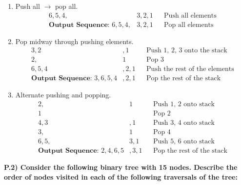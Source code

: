 \documentclass[12pt]{article}
\begin{document}
\begin{enumerate}
	\item Push all $\to$ pop all.
	\begin{align*}
		6, 5, 4,& 3, 2, 1 && \text{Push all elements} \\
		\textbf{Output Sequence: } 6, 5, 4,& 3, 2, 1 && \text{Pop all elements}
	\end{align*}
	\item Pop midway through pushing elements. 
	\begin{align*}
		3, 2&, 1 && \text{Push 1, 2, 3 onto the stack} \\
		2,& 1 && \text{Pop 3} \\
		6, 5, 4&, 2, 1 && \text{Push the rest of the elements} \\
		\textbf{Output Sequence: } 3, 6, 5, 4&, 2, 1 && \text{Pop the rest of the stack}
	\end{align*}
	\item Alternate pushing and popping.
	\begin{align*}
		2,& 1 && \text{Push 1, 2 onto stack} \\
		1& && \text{Pop 2} \\
		4, 3&, 1 && \text{Push 3, 4 onto stack} \\
		3,& 1 && \text{Pop 4} \\
		6, 5,& 3, 1 && \text{Push 5, 6 onto stack} \\
		\textbf{Output Sequence: } 2, 4, 6, 5&, 3, 1 && \text{Pop the rest of the stack}
	\end{align*}
\end{enumerate}
\newpage

\noindent \textbf{P.2) Consider the following binary tree with 15 nodes. Describe the order of nodes visited in each of
the following traversals of the tree:}

\begin{center}
\end{center}
\end{document}
